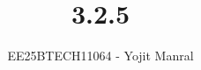 \documentclass[journal]{IEEEtran}
\begin{document}

\vspace{3cm}

\title{3.2.5}
\author{EE25BTECH11064 - Yojit Manral}

\maketitle
{\let\newpage\relax\maketitle}
\renewcommand{\thefigure}{\theenumi}
\renewcommand{\thetable}{\theenumi}
\setlength{\intextsep}{10pt} %
\end{document}
